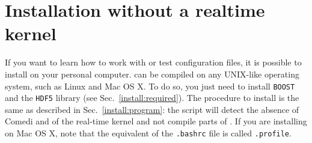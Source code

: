 \section{Installation without a realtime kernel}
\label{install:nokernel}
If you want to learn how to work with \progname or test configuration
files, it is possible to install \progname on your personal
computer. \progname can be compiled on any UNIX-like operating system,
such as Linux and Mac OS X. To do so, you just need to install
\texttt{BOOST} and the \texttt{HDF5} library (see
Sec.~\ref{install:required}). The procedure to install \progname is
the same as described in Sec.~\ref{install:program}: the
 script will detect the absence of Comedi and of
the real-time kernel and not compile parts of \progname. If you are
installing \progname on Mac OS X, note that the equivalent of the
\verb+.bashrc+ file is called \verb+.profile+.


